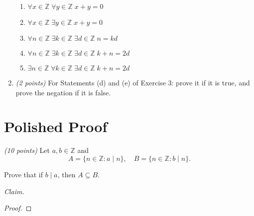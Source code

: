 \documentclass[12pt]{article}
\newcommand{\sset}{\subseteq}  %
\begin{document}
\begin{enumerate}[itemsep=1.2em]
\begin{enumerate}[label=\textbf{\alph*.}, itemsep=1em]
    \item \(\forall x \in \mathbb{Z} \; \forall y \in \mathbb{Z} \; x + y = 0\)\newline

    \item \(\forall x \in \mathbb{Z} \; \exists y \in \mathbb{Z} \; x + y = 0\)\newline

    \item \(\forall n \in \mathbb{Z} \; \exists k \in \mathbb{Z} \; \exists d \in \mathbb{Z} \; n = kd\)\newline

    \item \(\forall n \in \mathbb{Z} \; \exists k \in \mathbb{Z} \; \exists d \in \mathbb{Z} \; k + n = 2d\)\newline

    \item \(\exists n \in \mathbb{Z} \; \forall k \in \mathbb{Z} \; \exists d \in \mathbb{Z} \; k + n = 2d\)\newline

\end{enumerate}

\item \emph{(2 points)} For Statements (d) and (e) of Exercise 3: prove it if it is true, and prove the negation if it is false. \newline


\end{enumerate}
\newpage %

\section*{Polished Proof}

\emph{(10 points)} Let \( a, b \in \mathbb{Z} \) and
\[
A = \{ n \in \mathbb{Z} : a \mid n \}, \quad B = \{ n \in \mathbb{Z} : b \mid n \}.
\]

Prove that if \( b \mid a \), then \( A \sset B \).\newline

\noindent \emph{Claim.}

\begin{proof}
\end{proof}
\end{document}
